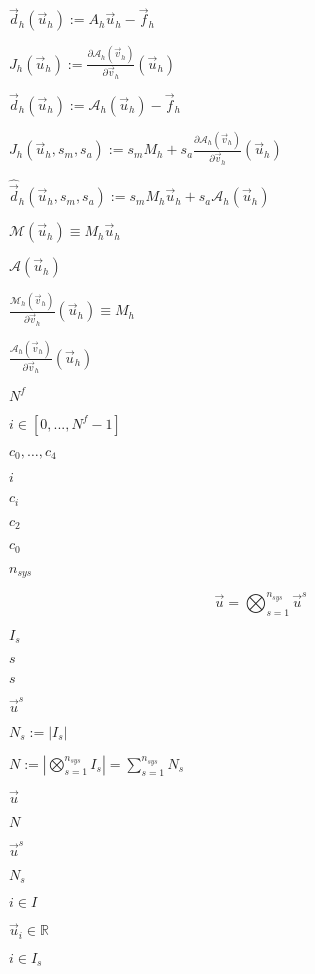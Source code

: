 \documentclass{article}
\begin{document}
$\vec{d}_h(\vec{u}_h) := A_h \vec{u}_h - \vec{f}_h$
\pagebreak

$J_h(\vec{u}_h) := \frac{\partial \mathcal{A}_h(\vec{v}_h)}{\partial \vec{v}_h} \left( \vec{u}_h \right)$
\pagebreak

$\vec{d}_h(\vec{u}_h) := \mathcal{A}_h(\vec{u}_h)-\vec{f}_h$
\pagebreak

$J_h(\vec{u}_h, s_m, s_a) := s_m M_h + s_a \frac{\partial \mathcal{A}_h(\vec{v}_h)}{\partial \vec{v}_h} \left( \vec{u}_h \right)$
\pagebreak

$\hat{\vec{d}}_h(\vec{u}_h, s_m, s_a) := s_m M_h \vec{u}_h + s_a \mathcal{A}_h(\vec{u}_h)$
\pagebreak

$\mathcal{M}(\vec{u}_h) \equiv M_h \vec{u}_h$
\pagebreak

$\mathcal{A}(\vec{u}_h)$
\pagebreak

$ \frac{\mathcal{M}_h(\vec{v}_h)}{\partial \vec{v}_h} \left( \vec{u}_h \right) \equiv M_h$
\pagebreak

$ \frac{\mathcal{A}_h(\vec{v}_h)}{\partial \vec{v}_h} \left( \vec{u}_h \right) $
\pagebreak

$ N^f $
\pagebreak

$ i \in [0, ..., N^f -1] $
\pagebreak

$ c_0, \ldots, c_4 $
\pagebreak

$i$
\pagebreak

$ c_i $
\pagebreak

$c_2$
\pagebreak

$c_0$
\pagebreak

$n_{sys}$
\pagebreak

\[ \vec{u} = \bigotimes_{s=1}^{n_{sys}} \vec{u}^s \]
\pagebreak

$ I_s $
\pagebreak

$s$
\pagebreak

$ s $
\pagebreak

$ \vec{u}^s$
\pagebreak

$N_s := |I_s|$
\pagebreak

$N := |\bigotimes\limits_{s=1}^{n_{sys}}I_s| = \sum\limits_{s=1}^{n_{sys}} N_s$
\pagebreak

$\vec{u}$
\pagebreak

$N$
\pagebreak

$ \vec{u}^s $
\pagebreak

$ N_s$
\pagebreak

$ i \in I $
\pagebreak

$ \vec{u}_i \in \mathbb{R}$
\pagebreak

$ i \in I_s$
\pagebreak
\end{document}
